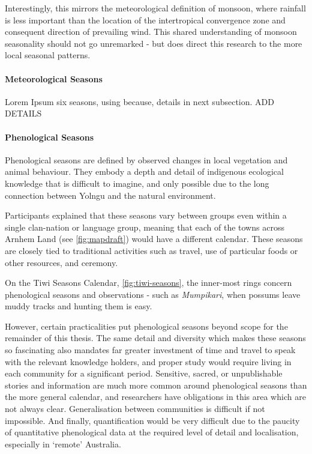 Interestingly, this mirrors the meteorological definition of monsoon,
where rainfall is less important than the location of the intertropical
convergence zone and consequent direction of prevailing wind.
This shared understanding of monsoon seasonality should not go unremarked -
but does direct this research to the more local seasonal patterns.


\paragraph{Meteorological Seasons}

Lorem Ipsum six seasons, using because, details in next subsection.  ADD DETAILS





\paragraph{Phenological Seasons}
Phenological seasons are defined by observed changes in local vegetation
and animal behaviour.  They embody a depth and detail of indigenous
ecological knowledge that is difficult to imagine, and only possible
due to the long connection between Yolngu and the natural environment.

Participants explained that these seasons vary between groups even within
a single clan-nation or language group, meaning that each of the towns
across Arnhem Land (see \autoref{fig:mapdraft}) would have a different
calendar.  
%
These seasons are closely tied to traditional activities such as travel,
use of particular foods or other resources, and ceremony.

On the Tiwi Seasons Calendar, \autoref{fig:tiwi-seasons}, the inner-most
rings concern phenological seasons and observations - such as
\textit{Mumpikari}, when possums leave muddy tracks and hunting them is easy.

However, certain practicalities put phenological seasons beyond scope
for the remainder of this thesis.
%
The same detail and diversity which makes these seasons so fascinating
also mandates far greater investment of time and travel to speak
with the relevant knowledge holders, and proper study would require
living in each community for a significant period.
%
Sensitive, sacred, or unpublishable stories and information are much more
common around phenological seasons than the more general calendar,
and researchers have obligations in this area which are not always clear.
%
Generalisation between communities is difficult if not impossible.
%
And finally, quantification would be very difficult due to the paucity
of quantitative phenological data at the required level of detail
and localisation, especially in `remote' Australia.





